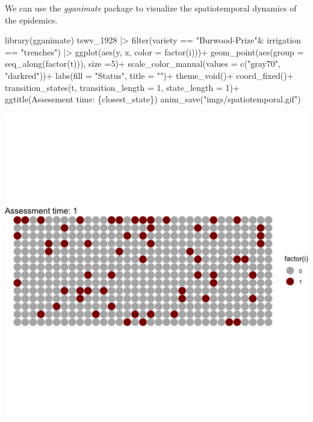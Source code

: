 \documentclass[
  letterpaper,
  DIV=11,
  numbers=noendperiod]{scrreprt}
\newenvironment{Shaded}{\begin{snugshade}}{\end{snugshade}}
\newcommand{\AttributeTok}[1]{\textcolor[rgb]{0.40,0.45,0.13}{#1}}
\newcommand{\DecValTok}[1]{\textcolor[rgb]{0.68,0.00,0.00}{#1}}
\newcommand{\FunctionTok}[1]{\textcolor[rgb]{0.28,0.35,0.67}{#1}}
\newcommand{\NormalTok}[1]{\textcolor[rgb]{0.00,0.23,0.31}{#1}}
\newcommand{\SpecialCharTok}[1]{\textcolor[rgb]{0.37,0.37,0.37}{#1}}
\newcommand{\StringTok}[1]{\textcolor[rgb]{0.13,0.47,0.30}{#1}}
\begin{document}
We can use the \emph{gganimate} package to visualize the spatiotemporal
dynamics of the epidemics.

\begin{Shaded}
\begin{Highlighting}[]
\FunctionTok{library}\NormalTok{(gganimate)}
\NormalTok{tswv\_1928 }\SpecialCharTok{|\textgreater{}}
  \FunctionTok{filter}\NormalTok{(variety }\SpecialCharTok{==} \StringTok{"Burwood{-}Prize"}\SpecialCharTok{\&}
\NormalTok{         irrigation }\SpecialCharTok{==} \StringTok{"trenches"}\NormalTok{) }\SpecialCharTok{|\textgreater{}} 
  \FunctionTok{ggplot}\NormalTok{(}\FunctionTok{aes}\NormalTok{(y, x, }\AttributeTok{color =} \FunctionTok{factor}\NormalTok{(i)))}\SpecialCharTok{+}
  \FunctionTok{geom\_point}\NormalTok{(}\FunctionTok{aes}\NormalTok{(}\AttributeTok{group =} \FunctionTok{seq\_along}\NormalTok{(}\FunctionTok{factor}\NormalTok{(t))), }\AttributeTok{size =}\DecValTok{5}\NormalTok{)}\SpecialCharTok{+}
  \FunctionTok{scale\_color\_manual}\NormalTok{(}\AttributeTok{values =} \FunctionTok{c}\NormalTok{(}\StringTok{"gray70"}\NormalTok{, }\StringTok{"darkred"}\NormalTok{))}\SpecialCharTok{+}
  \FunctionTok{labs}\NormalTok{(}\AttributeTok{fill =} \StringTok{"Status"}\NormalTok{, }\AttributeTok{title =} \StringTok{""}\NormalTok{)}\SpecialCharTok{+}
  \FunctionTok{theme\_void}\NormalTok{()}\SpecialCharTok{+}
  \FunctionTok{coord\_fixed}\NormalTok{()}\SpecialCharTok{+}
  \FunctionTok{transition\_states}\NormalTok{(t,}
                  \AttributeTok{transition\_length =} \DecValTok{1}\NormalTok{,}
                    \AttributeTok{state\_length =} \DecValTok{1}\NormalTok{)}\SpecialCharTok{+}
   \FunctionTok{ggtitle}\NormalTok{(}\StringTok{\textquotesingle{}Assessment time: \{closest\_state\}\textquotesingle{}}\NormalTok{)}
\FunctionTok{anim\_save}\NormalTok{(}\StringTok{"imgs/spatiotemporal.gif"}\NormalTok{)}
\end{Highlighting}
\end{Shaded}

\includegraphics[width=7.13542in,height=\textheight]{./imgs/spatiotemporal.gif}
\end{document}

